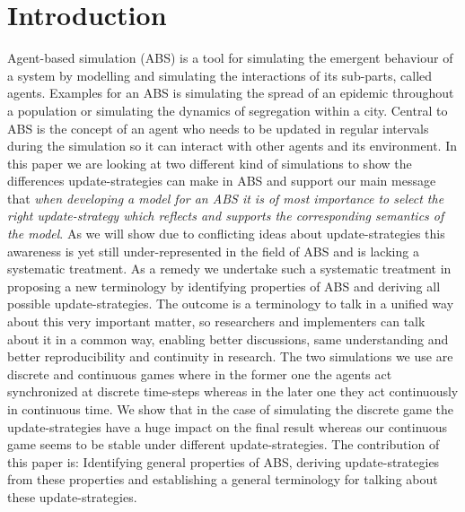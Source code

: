 \section{Introduction}
Agent-based simulation (ABS) is  a tool for simulating the emergent behaviour of a system by modelling and simulating the interactions of its sub-parts, called agents. Examples for an ABS is simulating the spread of an epidemic throughout a population or simulating the dynamics of segregation within a city. Central to ABS is the concept of an agent who needs to be updated in regular intervals during the simulation so it can interact with other agents and its environment. In this paper we are looking at two different kind of simulations to show the differences update-strategies can make in ABS and support our main message that \textit{when developing a model for an ABS it is of most importance to select the right update-strategy which reflects and supports the corresponding semantics of the model}. As we will show due to conflicting ideas about update-strategies this awareness is yet still under-represented in the field of ABS and is lacking a systematic treatment. As a remedy we undertake such a systematic treatment in proposing a new terminology by identifying properties of ABS and deriving all possible update-strategies. The outcome is a terminology to talk in a unified way about this very important matter, so researchers and implementers can talk about it in a common way, enabling better discussions, same understanding and better reproducibility and continuity in research.
The two simulations we use are discrete and continuous games where in the former one the agents act synchronized at discrete time-steps whereas in the later one they act continuously in continuous time. We show that in the case of simulating the discrete game the update-strategies have a huge impact on the final result whereas our continuous game seems to be stable under different update-strategies. The contribution of this paper is: Identifying general properties of ABS, deriving update-strategies from these properties and establishing a general terminology for talking about these update-strategies.
